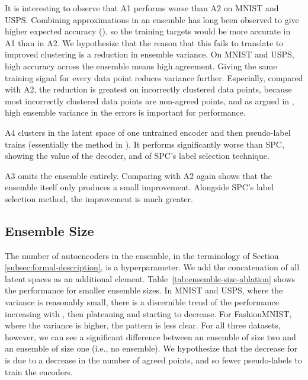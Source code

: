 \documentclass[runningheads]{llncs}
\begin{document}
It is interesting to observe that A1 performs worse than A2 on MNIST and USPS. Combining approximations in an ensemble has long been observed to give higher expected accuracy (\cite{clemen1989combining,pearlmutter1991chaitin,perrone1993improving,breiman1996bagging}), so the training targets would be more accurate in A1 than in A2. We hypothesize that the reason that this fails to translate to improved clustering is a reduction in ensemble variance. On MNIST and USPS, high accuracy across the ensemble means high agreement. Giving the same training signal for every data point reduces variance further. Especially, compared with A2,  the reduction is greatest on incorrectly clustered data points, because most incorrectly clustered data points are non-agreed points, and as argued in \cite{kittler1998combining}, high ensemble variance in the errors is important for performance. 

A4 clusters in the latent space of one untrained encoder and then pseudo-label trains (essentially the method  in \cite{caron2018deep}). It performs significantly worse than SPC, showing the value of the decoder, and of SPC's label selection technique.

A3 omits the ensemble entirely. Comparing with A2 again shows that the ensemble itself only produces a small improvement. Alongside SPC's label selection method, the improvement is much greater.


\subsection{Ensemble Size}
 The number of autoencoders in the ensemble,  in the terminology of Section \ref{subsec:formal-description}, is a hyperparameter. We add the concatenation of all latent spaces as an additional element. Table~\ref{tab:ensemble-size-ablation} shows the performance for smaller ensemble sizes. In MNIST and USPS, where the variance is reasonably small, there is a discernible trend of the performance increasing with , then plateauing and starting to decrease. For FashionMNIST, where the variance is higher, the pattern is less clear. For all three datasets, however, we can see a significant difference between an ensemble of size two and an ensemble of size one (i.e., no ensemble). We hypothesize that the decrease for  is due to a decrease in the number of agreed points, and so fewer pseudo-labels to train the encoders. 
 
\end{document}
